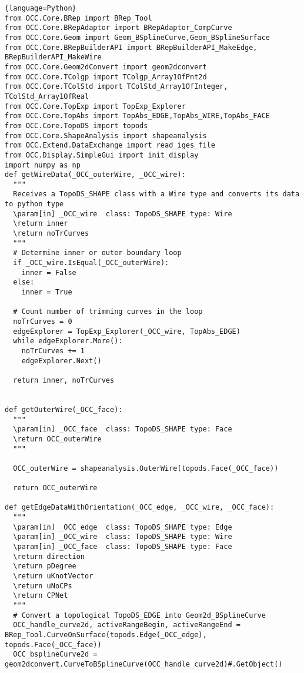 \lstset{style=python2}
\begin{adjustwidth}{-0.5cm}{-0.5cm}

\begin{lstlisting}{language=Python}
from OCC.Core.BRep import BRep_Tool
from OCC.Core.BRepAdaptor import BRepAdaptor_CompCurve
from OCC.Core.Geom import Geom_BSplineCurve,Geom_BSplineSurface
from OCC.Core.BRepBuilderAPI import BRepBuilderAPI_MakeEdge, BRepBuilderAPI_MakeWire
from OCC.Core.Geom2dConvert import geom2dconvert  
from OCC.Core.TColgp import TColgp_Array1OfPnt2d
from OCC.Core.TColStd import TColStd_Array1OfInteger, TColStd_Array1OfReal
from OCC.Core.TopExp import TopExp_Explorer  
from OCC.Core.TopAbs import TopAbs_EDGE,TopAbs_WIRE,TopAbs_FACE
from OCC.Core.TopoDS import topods
from OCC.Core.ShapeAnalysis import shapeanalysis
from OCC.Extend.DataExchange import read_iges_file
from OCC.Display.SimpleGui import init_display
import numpy as np
def getWireData(_OCC_outerWire, _OCC_wire):
  """
  Receives a TopoDS_SHAPE class with a Wire type and converts its data to python type
  \param[in] _OCC_wire	class: TopoDS_SHAPE	type: Wire
  \return inner
  \return noTrCurves
  """
  # Determine inner or outer boundary loop
  if _OCC_wire.IsEqual(_OCC_outerWire):
    inner = False
  else:
    inner = True

  # Count number of trimming curves in the loop
  noTrCurves = 0  
  edgeExplorer = TopExp_Explorer(_OCC_wire, TopAbs_EDGE)
  while edgeExplorer.More():
    noTrCurves += 1
    edgeExplorer.Next()
  
  return inner, noTrCurves


def getOuterWire(_OCC_face):
  """
  \param[in] _OCC_face	class: TopoDS_SHAPE	type: Face
  \return OCC_outerWire
  """
  
  OCC_outerWire = shapeanalysis.OuterWire(topods.Face(_OCC_face))

  return OCC_outerWire

def getEdgeDataWithOrientation(_OCC_edge, _OCC_wire, _OCC_face):
  """
  \param[in] _OCC_edge	class: TopoDS_SHAPE	type: Edge
  \param[in] _OCC_wire	class: TopoDS_SHAPE	type: Wire
  \param[in] _OCC_face	class: TopoDS_SHAPE	type: Face
  \return direction
  \return pDegree
  \return uKnotVector
  \return uNoCPs
  \return CPNet
  """
  # Convert a topological TopoDS_EDGE into Geom2d_BSplineCurve
  OCC_handle_curve2d, activeRangeBegin, activeRangeEnd = BRep_Tool.CurveOnSurface(topods.Edge(_OCC_edge), topods.Face(_OCC_face))
  OCC_bsplineCurve2d = geom2dconvert.CurveToBSplineCurve(OCC_handle_curve2d)#.GetObject()
  

\end{lstlisting}
\end{adjustwidth}
